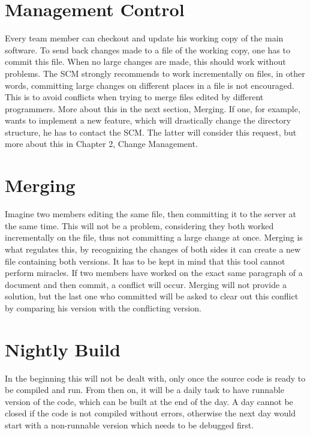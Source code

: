 \section{Management Control}
Every team member can checkout and update his working copy of the main software.
To send back changes made to a file of the working copy, one has to commit this file.
When no large changes are made, this should work without problems.
The SCM strongly recommends to work incrementally on files, in other words, committing large changes on different places in a file is not encouraged.
This is to avoid conflicts when trying to merge files edited by different programmers. More about this in the next section, Merging.
If one, for example, wants to implement a new feature, which will drastically change the directory structure, he has to contact the SCM.
The latter will consider this request, but more about this in Chapter 2, Change Management.

\section{Merging}
Imagine two members editing the same file, then committing it to the server at the same time.
This will not be a problem, considering they both worked incrementally on the file, thus not committing a large change at once.
Merging is what regulates this, by recognizing the changes of both sides it can create a new file containing both versions.
It has to be kept in mind that this tool cannot perform miracles.
If two members have worked on the exact same paragraph of a document and then commit, a conflict will occur.
Merging will not provide a solution, but the last one who committed will be asked to clear out this conflict by comparing his version with the conflicting version.

\section{Nightly Build}
In the beginning this will not be dealt with, only once the source code is ready to be compiled and run.
From then on, it will be a daily task to have runnable version of the code, which can be built at the end of the day.
A day cannot be closed if the code is not compiled without errors, otherwise the next day would start with a non-runnable version which needs to be debugged first.
